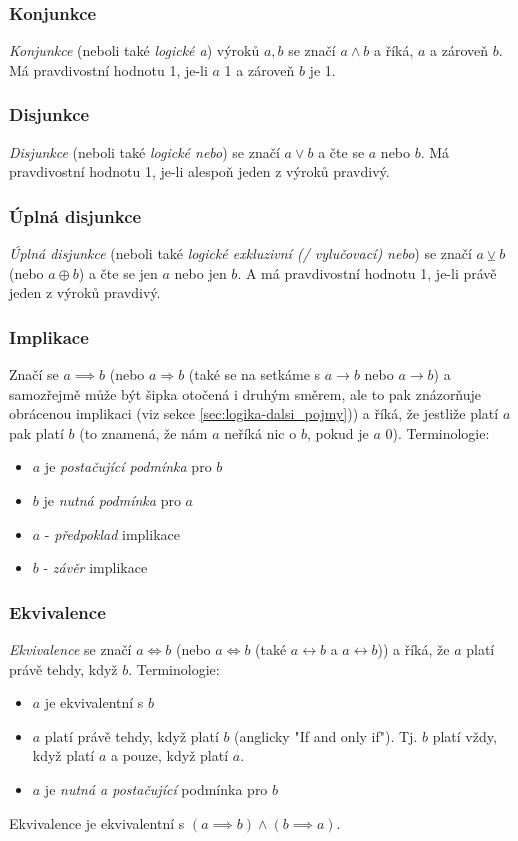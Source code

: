 \documentclass[12pt]{article}
\providecommand{\lxor}{\veebar}
\begin{document}
\subsubsection{Konjunkce}
\emph{Konjunkce} (neboli také \emph{logické a}) výroků $a,b$ se značí $a \land b$ a říká, $a$ a zároveň $b$. Má pravdivostní hodnotu 1, je-li $a$ 1 a zároveň $b$ je 1.
\subsubsection{Disjunkce}
\emph{Disjunkce} (neboli také \emph{logické nebo}) se značí $a \lor b$ a čte se $a$ nebo $b$. Má pravdivostní hodnotu 1, je-li alespoň jeden z výroků pravdivý.
\subsubsection{Úplná disjunkce}
\emph{Úplná disjunkce} (neboli také \emph{logické exkluzivní (/ vylučovací) nebo}) se značí $a \lxor b$ (nebo $a \oplus b$) a čte se jen $a$ nebo jen $b$. A má pravdivostní hodnotu 1, je-li právě jeden z výroků pravdivý.
\subsubsection{Implikace}
Značí se $ a \implies b$ (nebo $a \Rightarrow b$ (také se na setkáme s $a \rightarrow b$ nebo $a \longrightarrow b $) a samozřejmě může být šipka otočená i druhým směrem, ale to pak znázorňuje obrácenou implikaci (viz sekce \ref{sec:logika-dalsi_pojmy})) a říká, že jestliže platí $a$ pak platí $b$ (to znamená, že nám $a$ neříká nic o $b$, pokud je $a$ 0). Terminologie:
\begin{itemize}
\item $a$ je \emph{postačující podmínka} pro $b$
\item $b$ je \emph{nutná podmínka} pro $a$
\item $a$ - \emph{předpoklad} implikace
\item $b$ - \emph{závěr} implikace
\end{itemize}
\subsubsection{Ekvivalence}
\emph{Ekvivalence} se značí $a \iff b$ (nebo $a \Leftrightarrow b$ (také $a \leftrightarrow b$ a $a \longleftrightarrow b$)) a říká, že $a$ platí právě tehdy, když $b$. Terminologie:
\begin{itemize}
\item $a$ je ekvivalentní s $b$
\item $a$ platí právě tehdy, když platí $b$ (anglicky "If and only if"). Tj. $b$ platí vždy, když platí $a$ a pouze, když platí $a$.
\item $a$ je \emph{nutná a postačující} podmínka pro $b$
\end{itemize}
Ekvivalence je ekvivalentní s $(a \implies b) \land (b \implies a)$.
\end{document}
